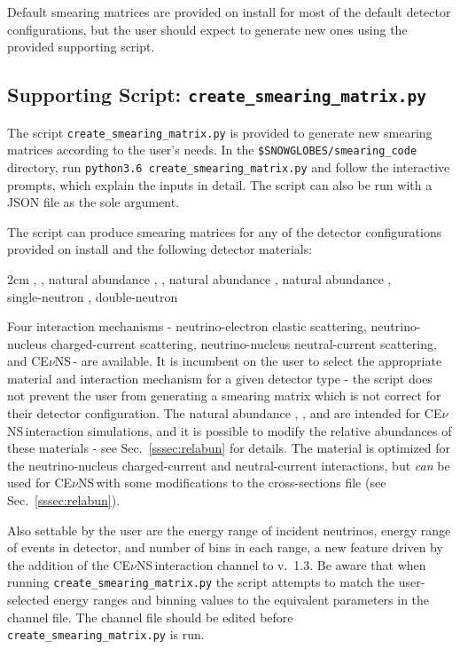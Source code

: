 \documentclass{article}
\newcommand{\cev}{CE$\nu$NS\,}
\begin{document}
Default smearing matrices are provided on install for most of the default detector configurations, but the user should expect to generate new ones using the provided supporting script.

\subsection{Supporting Script: \texttt{create\_smearing\_matrix.py}} \label{subsec:csm.py}

The script \texttt{create\_smearing\_matrix.py} is provided to generate new smearing matrices according to the user's needs. In the \texttt{\$SNOWGLOBES/smearing\_code} directory, run 
\texttt{python3.6 create\_smearing\_matrix.py} and follow the interactive prompts,
which explain the inputs in detail. The script can also be run with a JSON file as the sole argument.

The script can produce smearing matrices for any of the detector configurations provided on install and the following detector materials:
 
\begin{adjustwidth}{2cm}{}
    \noindent {}, , natural abundance , , natural abundance , natural abundance , \\single-neutron , double-neutron 
\end{adjustwidth}

\noindent Four interaction mechanisms - neutrino-electron elastic scattering, neutrino-nucleus charged-current scattering, neutrino-nucleus neutral-current scattering, and \cev - are available. It is incumbent on the user to select the appropriate material and interaction mechanism for a given detector type - the script does not prevent the user from generating a smearing matrix which is not correct for their detector configuration. The natural abundance , , and  are intended for \cev interaction simulations, and it is possible to modify the relative abundances of these materials - see Sec.~\ref{sssec:relabun} for details. The  material is optimized for the neutrino-nucleus charged-current and neutral-current interactions, but \textit{can} be used for \cev with some modifications to the cross-sections file (see Sec.~\ref{sssec:relabun}).  

Also settable by the user are the energy range of incident neutrinos, energy range of events in detector, and number of bins in each range, a new feature driven by the addition of the \cev interaction channel to v.~1.3. Be aware that when running \texttt{create\_smearing\_matrix.py} the script attempts to match the user-selected energy ranges and binning values to the equivalent parameters in the channel file. The channel file should be edited before \texttt{create\_smearing\_matrix.py} is run.
\end{document}
